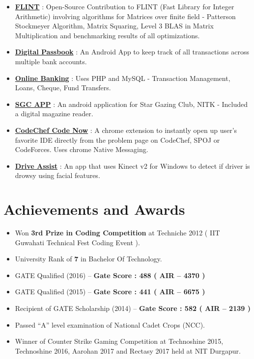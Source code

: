 \documentclass[margin, centered]{res}
\begin{document}
\begin{resume}
\begin{itemize}[leftmargin=*]
 \item \textbf{\href{https://github.com/ashish1294/flint2}{FLINT}} : Open-Source Contribution to FLINT (Fast Library for Integer Arithmetic) involving algorithms for Matrices over finite field - Patterson Stockmeyer Algorithm, Matrix Squaring, Level 3 BLAS in Matrix Multiplication and benchmarking results of all optimizations.
 \item \textbf{\href{https://github.com/ashish1294/DigitalPassbook}{Digital Passbook}} : An Android App to keep track of all transactions across multiple bank accounts.
 \item \textbf{\href{https://github.com/ashish1294/OnlineBankingPHP}{Online Banking}} : Uses PHP and MySQL - Transaction Management, Loans, Cheque, Fund Transfers.
 \item \textbf{\href{https://github.com/ashish1294/SGC-App}{SGC APP}} : An android application for Star Gazing Club, NITK - Included a digital magazine reader.
 \item \textbf{\href{https://github.com/ashish1294/code-now-CodeChef}{CodeChef Code Now}} : A chrome extension to instantly open up user's favorite IDE directly from the problem page on CodeChef, SPOJ or CodeForces. Uses chrome Native Messaging.
 \item \textbf{\href{}{Drive Assist}} : An app that uses Kinect v2 for Windows to detect if driver is drowsy using facial features.
\end{itemize}


\section{Achievements and Awards}
\begin{itemize}[leftmargin=*]
 \item Won \textbf{3rd Prize in Coding Competition} at Techniche 2012 ( IIT Guwahati Technical Fest Coding Event ).
 \item University Rank of \textbf{7} in Bachelor Of Technology.
 \item GATE Qualified (2016) – \textbf{Gate Score : 488 ( AIR – 4370 ) }
 \item GATE Qualified (2015) – \textbf{Gate Score : 441 ( AIR – 6675 ) }
 \item Recipient of GATE Scholarship (2014) – \textbf{Gate Score : 582 ( AIR – 2139 ) }
 \item Passed “A” level examination of National Cadet Crops (NCC).
 \item Winner of Counter Strike Gaming Competition at Technoshine 2015, Technoshine 2016, Aarohan 2017 and Rectasy 2017 held at NIT Durgapur.
\end{itemize}


\end{resume}
\end{document}
